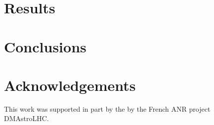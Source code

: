 \documentclass[12pt]{article}
\begin{document}
\section{Results}


\section{Conclusions}


\clearpage
\section*{Acknowledgements} 

This work was supported in part by the by the French 
ANR project {\sc DMAstroLHC}. %

\begin{appendix}

\end{appendix}



\end{document}
